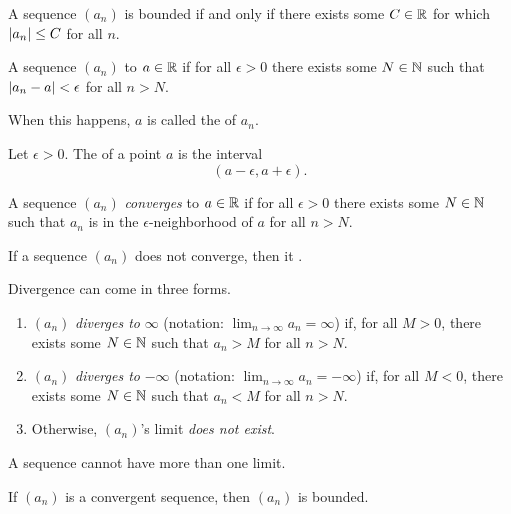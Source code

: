 \documentclass[11pt,twoside=off,numbers=noenddot]{scrbook}
\begin{document}
\begin{proposition}
    A sequence $(a_n)$ is bounded if and only if there exists some $C \in \mathbb R$ for which $| a_n | \leq C$ for all $n$.
\end{proposition}

\begin{definition}
    A sequence $(a_n)$  to $a \in \mathbb R$ if for all $\epsilon > 0$ there exists some $N \in \mathbb N$ such that $| a_n - a | < \epsilon$ for all $n > N$.

    When this happens, $a$ is called the  of $a_n$.
\end{definition}

\begin{definition}
    Let $\epsilon > 0$. The  of a point $a$ is the interval
    \[ (a - \epsilon, a + \epsilon). \]
\end{definition}

\begin{definition}
    A sequence $(a_n)$ \textit{converges} to $a \in \mathbb R$ if for all $\epsilon > 0$ there exists some $N \in \mathbb N$ such that $a_n$ is in the $\epsilon$-neighborhood of $a$ for all $n > N$.
\end{definition}

\begin{definition}
    If a sequence $(a_n)$ does not converge, then it .

    Divergence can come in three forms.
    \begin{enumerate}
        \item $(a_n)$ \textit{diverges to} $\infty$ (notation: $\lim_{n \to \infty} a_n = \infty$) if, for all $M > 0$, there exists some $N \in \mathbb N$ such that $a_n > M$ for all $n > N$.
        \item $(a_n)$ \textit{diverges to} $-\infty$ (notation: $\lim_{n \to \infty} a_n = -\infty$) if, for all $M < 0$, there exists some $N \in \mathbb N$ such that $a_n < M$ for all $n > N$.
        \item Otherwise, $(a_n)$'s limit \textit{does not exist}.
    \end{enumerate}
\end{definition}

\begin{proposition}
    A sequence cannot have more than one limit.
\end{proposition}

\begin{proposition}
    If $(a_n)$ is a convergent sequence, then $(a_n)$ is bounded.
\end{proposition}
\end{document}
